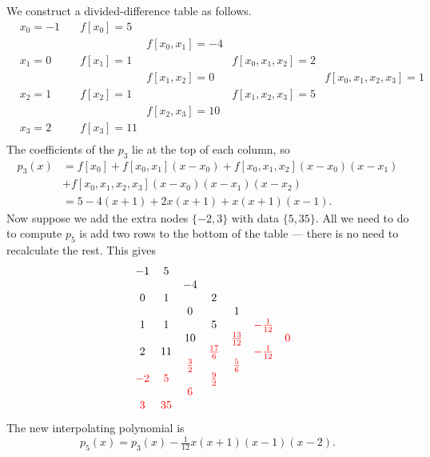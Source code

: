 \documentclass[
  letterpaper,
  DIV=11,
  numbers=noendperiod]{scrreprt}
\newenvironment{fbxSimple}[3]{\begin{tcolorbox}[enhanced, breakable,%
attach boxed title to top*={xshift=1.4pt},
boxed title style={boxrule=0.0mm, fuzzy shadow={1pt}{-1pt}{0mm}{0.1mm}{gray}, arc=.3em, rounded corners=east, sharp corners=west}, colframe=#1-color2, colbacktitle=#1-color1, colback = white, coltitle=black,  titlerule=0mm, toprule=0pt, bottomrule=.7pt, leftrule=.3em, rightrule=.7pt, outer arc=.3em,  	left=.5em, right=.5em, bottomtitle=1mm, toptitle=1mm,title=\textbf{#2}\hspace{0.5em}{#3}]}
{\end{tcolorbox}}
\begin{document}
\label{construct-the-newton-polynomial-at-the-nodes--1012-and-with-corresponding-function-values-51111}
\begin{fbxSimple}{eg}{Example 2.5: }{Construct the Newton polynomial at the nodes \(\{-1,0,1,2\}\) and with corresponding function values \(\{5,1,1,11\}\)}
\label{construct-the-newton-polynomial-at-the-nodes--1012-and-with-corresponding-function-values-51111}
We construct a divided-difference table as follows. \[
\begin{matrix}
&x_0=-1 \quad &f[x_0]=5 & & &\\
& & &f[x_0,x_1]=-4 & &\\
&x_1=0 \quad &f[x_1]=1 & &f[x_0,x_1,x_2]=2 &\\
& & &f[x_1,x_2]=0 & &f[x_0,x_1,x_2,x_3]=1\\
&x_2=1 \quad &f[x_2]=1 & &f[x_1,x_2,x_3]=5 &\\
& & &f[x_2,x_3]=10 & &\\
&x_3=2 \quad &f[x_3]=11 & & &\\
\end{matrix}
\] The coefficients of the \(p_3\) lie at the top of each column, so \[
\begin{aligned}
p_3(x) &= f[x_0] + f[x_0,x_1](x-x_0) + f[x_0,x_1,x_2](x-x_0)(x-x_1)\\
& + f[x_0,x_1,x_2,x_3](x-x_0)(x-x_1)(x-x_2)\\
&=5 - 4(x+1) + 2x(x+1) + x(x+1)(x-1).
\end{aligned}
\] Now suppose we add the extra nodes \(\{-2,3\}\) with data
\(\{5,35\}\). All we need to do to compute \(p_5\) is add two rows to
the bottom of the table --- there is no need to recalculate the rest.
This gives \[
\begin{matrix}
&-1  &5 & & & & &\\
& & &-4 & & & &\\
&0  &1 & &2 & & &\\
& & &0 & &1 & &\\
&1  &1 & &5 & &\textcolor{red}{-\tfrac1{12}} &\\
& & &10 & &\textcolor{red}{\tfrac{13}{12}} & &\textcolor{red}{0}\\
&2 &11 & &\textcolor{red}{\tfrac{17}{6}} & &\textcolor{red}{-\tfrac1{12}}\\
& & &\textcolor{red}{\tfrac{3}{2}} & &\textcolor{red}{\tfrac{5}{6}} & &\\
&\textcolor{red}{-2} &\textcolor{red}{5} & &\textcolor{red}{\tfrac92} & &&\\
& & &\textcolor{red}{6} & & & &\\
&\textcolor{red}{3}  &\textcolor{red}{35} & & & & &\\
\end{matrix}
\] The new interpolating polynomial is \[
p_5(x) = p_3(x) - \tfrac{1}{12}x(x+1)(x-1)(x-2).
\]

\end{fbxSimple}
\end{document}
